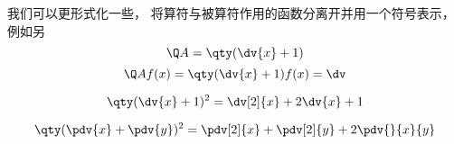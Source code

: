 
我们可以更形式化一些， 将算符与被算符作用的函数分离开并用一个符号表示， 例如另
\begin{equation}
\Q A = \qty(\dv{x} + 1)
\end{equation}
\begin{equation}
\Q A f(x) = \qty(\dv{x} + 1)f(x) = \dv
\end{equation}

\begin{equation}
\qty(\dv{x} + 1)^2 = \dv[2]{x} + 2\dv{x} + 1
\end{equation}

\begin{equation}
\qty(\pdv{x} + \pdv{y})^2 = \pdv[2]{x} + \pdv[2]{y} + 2\pdv{}{x}{y}
\end{equation}

\begin{equation}

\end{equation}
